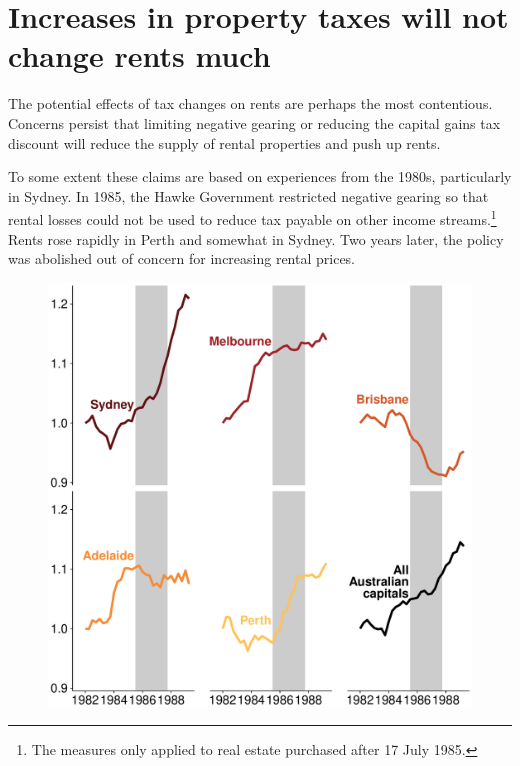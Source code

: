 \section{Increases in property taxes will not change rents much}\label{sec:Increases-property-taxes-will-not-change-rents}
The potential effects of tax changes on rents are perhaps the most contentious. Concerns persist that limiting negative gearing or reducing the capital gains tax discount will reduce the supply of rental properties and push up rents. 

To some extent these claims are based on experiences from the 1980s, particularly in Sydney. 
In 1985, the Hawke Government restricted negative gearing so that rental losses could not be used to reduce tax payable on other income streams.\footnote{\textcite[][20]{McKellInstitute2015SwitchingGears}  The measures only applied to real estate purchased after 17 July 1985.}
Rents rose rapidly in Perth and somewhat in Sydney. 
Two years later, the policy was abolished out of concern for increasing rental prices. 

\begin{figure}
\includegraphics[width=\columnwidth]{CGT-NG-atlas/Capital_city_rents_direct_abs-1}
\end{figure}


